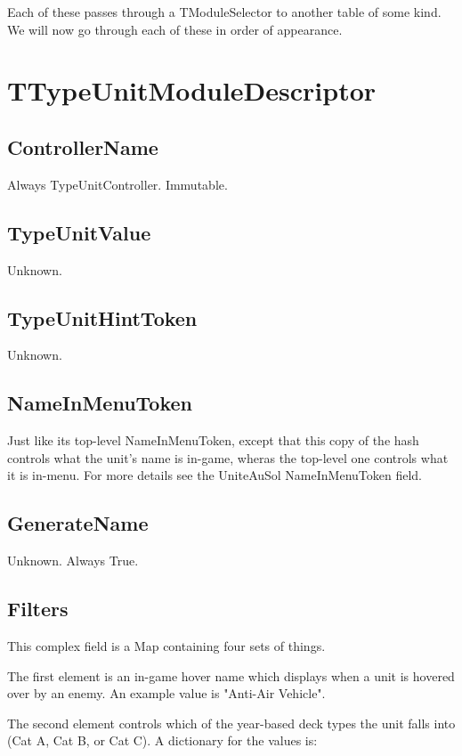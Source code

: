 \documentclass{article}
\begin{document}
Each of these passes through a TModuleSelector to another table of some kind. We will now go through each of these in order of appearance.

\section{TTypeUnitModuleDescriptor}

\subsection{ControllerName}

Always TypeUnitController. Immutable.

\subsection{TypeUnitValue}

Unknown.

\subsection{TypeUnitHintToken}

Unknown.

\subsection{NameInMenuToken}

Just like its top-level NameInMenuToken, except that this copy of the hash controls what the unit's name is in-game, wheras the top-level one controls what it is in-menu. For more details see the UniteAuSol NameInMenuToken field.

\subsection{GenerateName}

Unknown. Always True.

\subsection{Filters}

This complex field is a Map containing four sets of things.

The first element is an in-game hover name which displays when a unit is hovered over by an enemy. An example value is "Anti-Air Vehicle".

The second element controls which of the year-based deck types the unit falls into (Cat A, Cat B, or Cat C). A dictionary for the values is:
\end{document}
